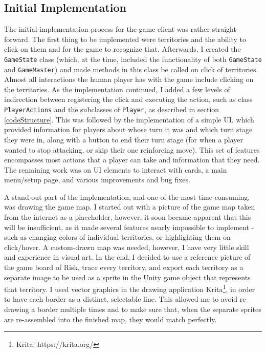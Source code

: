 \subsection{Initial Implementation}
\label{initialImplementation}
The initial implementation process for the game client was rather straight-forward. The first thing to be implemented were territories and the ability to click on them and for the game to recognize that. Afterwards, I created the \texttt{GameState} class (which, at the time, included the functionality of both \texttt{GameState} and \texttt{GameMaster}) and made methods in this class be called on click of territories. Almost all interactions the human player has with the game include clicking on the territories. As the implementation continued, I added a few levels of indirection between registering the click and executing the action, such as class \texttt{PlayerActions} and the subclasses of \texttt{Player}, as described in section \ref{codeStructure}. This was followed by the implementation of a simple UI, which provided information for players about whose turn it was and which turn stage they were in, along with a button to end their turn stage (for when a player wanted to stop attacking, or skip their one reinforcing move). This set of features encompasses most actions that a player can take and information that they need. The remaining work was on UI elements to interact with cards, a main menu/setup page, and various improvements and bug fixes.

A stand-out part of the implementation, and one of the most time-consuming, was drawing the game map. I started out with a picture of the game map taken from the internet as a placeholder, however, it soon became apparent that this will be insufficient, as it made several features nearly impossible to implement - such as changing colors of individual territories, or highlighting them on click/hover. A custom-drawn map was needed, however, I have very little skill and experience in visual art. In the end, I decided to use a reference picture of the game board of Risk, trace every territory, and export each territory as a separate image to be used as a sprite in the Unity game object that represents that territory. I used vector graphics in the drawing application Krita\footnote{Krita: https://krita.org/}, in order to have each border as a distinct, selectable line. This allowed me to avoid re-drawing a border multiple times and to make sure that, when the separate sprites are re-assembled into the finished map, they would match perfectly.

